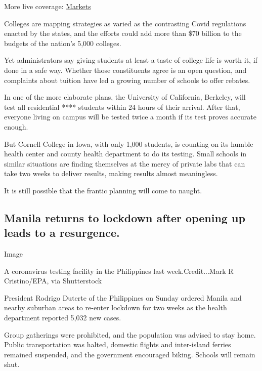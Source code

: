 More live coverage:
\href{https://www.nytimes.com/live/2020/08/03/business/stock-market-today-coronavirus?action=click\&pgtype=Article\&state=default\&region=MAIN_CONTENT_1\&context=storylines_live_updates}{Markets}

Colleges are mapping strategies as varied as the contrasting Covid
regulations enacted by the states, and the efforts could add more than
\$70 billion to the budgets of the nation's 5,000 colleges.

Yet administrators say giving students at least a taste of college life
is worth it, if done in a safe way. Whether those constituents agree is
an open question, and complaints about tuition have led a growing number
of schools to offer rebates.

In one of the more elaborate plans, the University of California,
Berkeley, will test all residential **** students within 24 hours of
their arrival. After that, everyone living on campus will be tested
twice a month if its test proves accurate enough.

But Cornell College in Iowa, with only 1,000 students, is counting on
its humble health center and county health department to do its testing.
Small schools in similar situations are finding themselves at the mercy
of private labs that can take two weeks to deliver results, making
results almost meaningless.

It is still possible that the frantic planning will come to naught.

\hypertarget{manila-returns-to-lockdown-after-opening-up-leads-to-a-resurgence}{%
\subsection{Manila returns to lockdown after opening up leads to a
resurgence.}\label{manila-returns-to-lockdown-after-opening-up-leads-to-a-resurgence}}

Image

A coronavirus testing facility in the Philippines last
week.Credit...Mark R Cristino/EPA, via Shutterstock

President Rodrigo Duterte of the Philippines on Sunday ordered Manila
and nearby suburban areas to re-enter lockdown for two weeks as the
health department reported 5,032 new cases.

Group gatherings were prohibited, and the population was advised to stay
home. Public transportation was halted, domestic flights and
inter-island ferries remained suspended, and the government encouraged
biking. Schools will remain shut.

